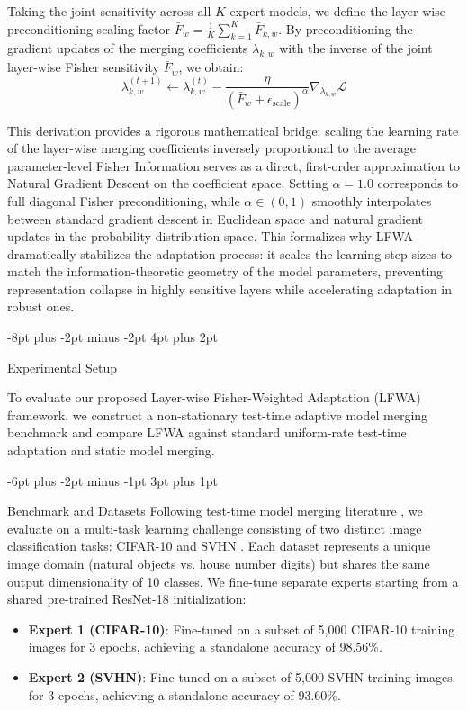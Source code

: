 \documentclass{article}
\makeatletter
\theoremstyle{plain}
\theoremstyle{definition}
\theoremstyle{remark}
\renewcommand{\section}{\@startsection{section}{1}{\z@}%
                       {-8pt plus -2pt minus -2pt}%
                       {4pt plus 2pt}%
                       {\normalfont\large\bfseries\raggedright}}
\renewcommand{\subsection}{\@startsection{subsection}{2}{\z@}%
                          {-6pt plus -2pt minus -1pt}%
                          {3pt plus 1pt}%
                          {\normalfont\normalsize\bfseries\raggedright}}
\makeatother
\begin{document}
Taking the joint sensitivity across all $K$ expert models, we define the layer-wise preconditioning scaling factor $\bar{F}_w = \frac{1}{K} \sum_{k=1}^K \bar{F}_{k, w}$.
By preconditioning the gradient updates of the merging coefficients $\lambda_{k, w}$ with the inverse of the joint layer-wise Fisher sensitivity $\bar{F}_w$, we obtain:
\begin{equation}
\lambda_{k, w}^{(t+1)} \leftarrow \lambda_{k, w}^{(t)} - \frac{\eta}{\left(\bar{F}_w + \epsilon_{\text{scale}}\right)^\alpha} \nabla_{\lambda_{k, w}} \mathcal{L}
\end{equation}

This derivation provides a rigorous mathematical bridge: scaling the learning rate of the layer-wise merging coefficients inversely proportional to the average parameter-level Fisher Information serves as a direct, first-order approximation to Natural Gradient Descent on the coefficient space. Setting $\alpha = 1.0$ corresponds to full diagonal Fisher preconditioning, while $\alpha \in (0, 1)$ smoothly interpolates between standard gradient descent in Euclidean space and natural gradient updates in the probability distribution space. This formalizes why LFWA dramatically stabilizes the adaptation process: it scales the learning step sizes to match the information-theoretic geometry of the model parameters, preventing representation collapse in highly sensitive layers while accelerating adaptation in robust ones.

\section{Experimental Setup}
\label{sec:experiments}

To evaluate our proposed Layer-wise Fisher-Weighted Adaptation (LFWA) framework, we construct a non-stationary test-time adaptive model merging benchmark and compare LFWA against standard uniform-rate test-time adaptation and static model merging.

\subsection{Benchmark and Datasets}
Following test-time model merging literature \cite{yang2023adamerging,jung2025symerge}, we evaluate on a multi-task learning challenge consisting of two distinct image classification tasks: CIFAR-10 \cite{krizhevsky2009learning} and SVHN \cite{netzer2011reading}.
Each dataset represents a unique image domain (natural objects vs. house number digits) but shares the same output dimensionality of 10 classes.
We fine-tune separate experts starting from a shared pre-trained ResNet-18 initialization:
\begin{itemize}\setlength{\itemsep}{1pt}\setlength{\parskip}{0pt}\setlength{\parsep}{0pt}
    \item \textbf{Expert 1 (CIFAR-10)}: Fine-tuned on a subset of 5,000 CIFAR-10 training images for 3 epochs, achieving a standalone accuracy of 98.56\%.
    \item \textbf{Expert 2 (SVHN)}: Fine-tuned on a subset of 5,000 SVHN training images for 3 epochs, achieving a standalone accuracy of 93.60\%.
\end{itemize}
\end{document}

